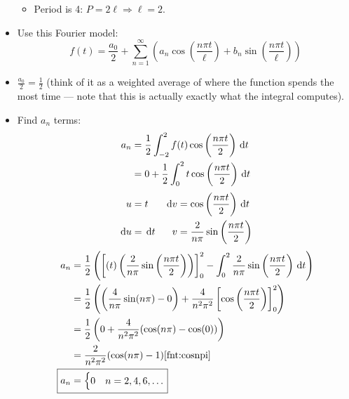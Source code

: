 \documentclass{article}
\begin{document}
\begin{itemize}
\begin{center}
    \end{center}
    \begin{itemize}
        \item Period is 4: $P=2\ell\Rightarrow\ell=2$.
    \end{itemize}
    \item Use this Fourier model:
    \begin{equation*}
        f(t) = \frac{a_0}{2}+\sum_{n=1}^\infty \left( a_n\cos\left( \frac{n\pi t}{\ell} \right)+b_n\sin\left( \frac{n\pi t}{\ell} \right) \right)
    \end{equation*}
    \item $\frac{a_0}{2}=\frac{1}{2}$ (think of it as a weighted average of where the function spends the most time --- note that this is actually exactly what the integral computes).
    \item Find $a_n$ terms:
    \begin{align*}
        a_n &= \frac{1}{2}\int_{-2}^2 f(t)\cos\left( \frac{n\pi t}{2} \right)\, \text{d}t\\
        &= 0+\frac{1}{2}\int_0^2 t\cos\left( \frac{n\pi t}{2} \right)\, \text{d}t
    \end{align*}
    \begin{align*}
        u &= t&
            \, \text{d}v &= \cos\left( \frac{n\pi t}{2} \right)\, \text{d}t\\
        \, \text{d}u &= \, \text{d}t&
            v &= \frac{2}{n\pi}\sin\left( \frac{n\pi t}{2} \right)
    \end{align*}
    \begin{align*}
        a_n &= \frac{1}{2}\left( \left[ (t)\left( \frac{2}{n\pi}\sin\left( \frac{n\pi t}{2} \right) \right) \right]_0^2 - \int_0^2 \frac{2}{n\pi}\sin\left( \frac{n\pi t}{2} \right)\D{t} \right)\\
        &= \frac{1}{2}\left( \left( \frac{4}{n\pi}\sin(n\pi) - 0 \right) + \frac{4}{n^2\pi^2}\left[ \cos\left( \frac{n\pi t}{2} \right) \right]_0^2 \right)\\
        &= \frac{1}{2}\left( 0+\frac{4}{n^2\pi^2}(\cos(n\pi)-\cos(0)) \right)\\
        &= \frac{2}{n^2\pi^2}(\cos(n\pi)-1)\cref{fnt:cosnpi}\\
        \Aboxed{a_n &= {
            \begin{cases}
                0 & n=2,4,6,\dots\\

\end{cases}}}
\end{align*}
\end{itemize}
\end{document}

